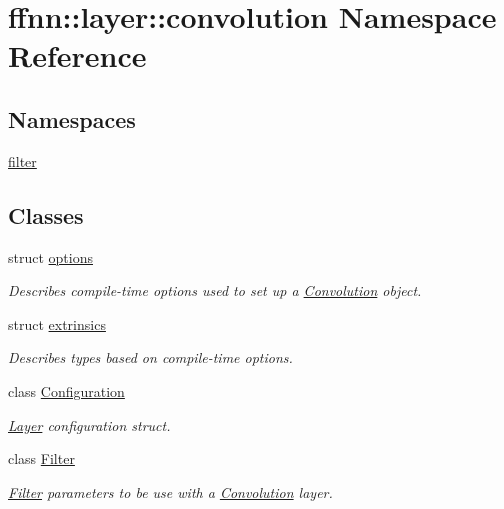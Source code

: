 \hypertarget{namespaceffnn_1_1layer_1_1convolution}{\section{ffnn\-:\-:layer\-:\-:convolution Namespace Reference}
\label{namespaceffnn_1_1layer_1_1convolution}
}
\subsection*{Namespaces}
\begin{DoxyCompactItemize}
\item 
\hyperlink{namespaceffnn_1_1layer_1_1convolution_1_1filter}{filter}
\end{DoxyCompactItemize}
\subsection*{Classes}
\begin{DoxyCompactItemize}
\item 
struct \hyperlink{structffnn_1_1layer_1_1convolution_1_1options}{options}
\begin{DoxyCompactList}\small\item\em Describes compile-\/time options used to set up a \hyperlink{classffnn_1_1layer_1_1_convolution}{Convolution} object. \end{DoxyCompactList}\item 
struct \hyperlink{structffnn_1_1layer_1_1convolution_1_1extrinsics}{extrinsics}
\begin{DoxyCompactList}\small\item\em Describes types based on compile-\/time options. \end{DoxyCompactList}\item 
class \hyperlink{classffnn_1_1layer_1_1convolution_1_1_configuration}{Configuration}
\begin{DoxyCompactList}\small\item\em \hyperlink{classffnn_1_1layer_1_1_layer}{Layer} configuration struct. \end{DoxyCompactList}\item 
class \hyperlink{classffnn_1_1layer_1_1convolution_1_1_filter}{Filter}
\begin{DoxyCompactList}\small\item\em \hyperlink{classffnn_1_1layer_1_1convolution_1_1_filter}{Filter} parameters to be use with a \hyperlink{classffnn_1_1layer_1_1_convolution}{Convolution} layer. \end{DoxyCompactList}\end{DoxyCompactItemize}
